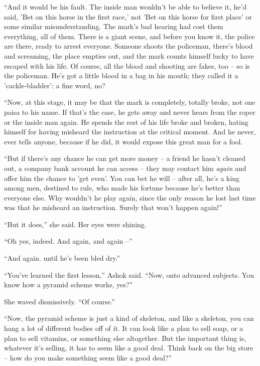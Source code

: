 ``And it would be his fault. The inside man wouldn't be able to
believe it, he'd said, 'Bet on this horse in the first race,' not
'Bet on this horse for first place' or some similar
misunderstanding. The mark's bad hearing had cost them everything,
all of them. There is a giant scene, and before you know it, the
police are there, ready to arrest everyone. Someone shoots the
policeman, there's blood and screaming, the place empties out, and
the mark counts himself lucky to have escaped with his life. Of
course, all the blood and shooting are fakes, too -- so is the
policeman. He's got a little blood in a bag in his mouth; they
called it a 'cackle-bladder': a fine word, no?

``Now, at this stage, it may be that the mark is completely, totally
broke, not one paisa to his name. If that's the case, he gets away
and never hears from the roper or the inside man again. He spends
the rest of his life broke and broken, hating himself for having
misheard the instruction at the critical moment. And he never, ever
tells anyone, because if he did, it would expose this great man for
a fool.

``But if there's any chance he can get more money -- a friend he
hasn't cleaned out, a company bank account he can access -- they
may contact him \emph{again} and offer him the chance to 'get
even'. You can bet he will -- after all, he's a king among men,
destined to rule, who made his fortune because he's better than
everyone else. Why wouldn't he play again, since the only reason he
lost last time was that he misheard an instruction. Surely that
won't happen again!''

``But it does,'' she said. Her eyes were shining.

``Oh yes, indeed. And again, and again --''

``And again. until he's been bled dry.''

``You've learned the first lesson,'' Ashok said. ``Now, onto advanced
subjects. You know how a pyramid scheme works, yes?''

She waved dismissively. ``Of course.''

``Now, the pyramid scheme is just a kind of skeleton, and like a
skeleton, you can hang a lot of different bodies off of it. It can
look like a plan to sell soap, or a plan to sell vitamins, or
something else altogether. But the important thing is, whatever
it's selling, it has to seem like a good deal. Think back on the
big store -- how do you make something seem like a good deal?''

